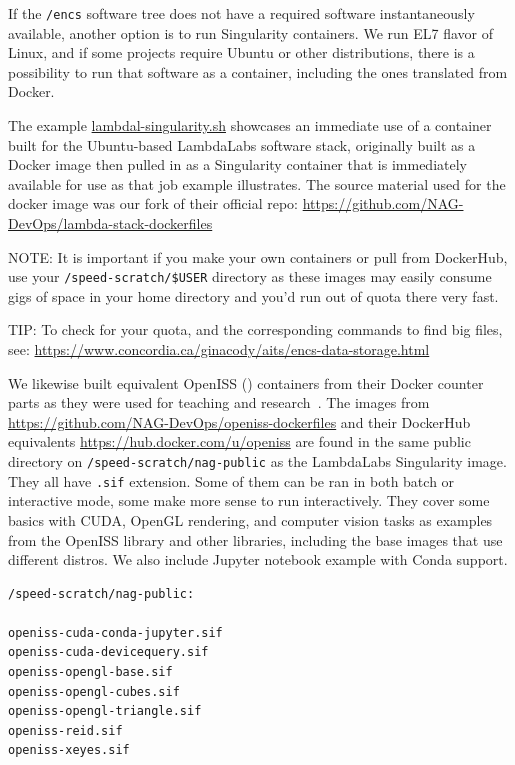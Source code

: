 
If the \texttt{/encs} software tree does not have a required software
instantaneously available, another option is to run Singularity
containers. We run EL7 flavor of Linux, and if some projects
require Ubuntu or other distributions, there is a possibility
to run that software as a container, including the ones
translated from Docker.

The example
  \href{https://github.com/NAG-DevOps/speed-hpc/blob/master/src/lambdal-singularity.sh}
  {lambdal-singularity.sh}
showcases an immediate use of a container built for the Ubuntu-based
LambdaLabs software stack, originally built as a Docker image then
pulled in as a Singularity container that is immediately available
for use as that job example illustrates. The source material
used for the docker image was our fork of their official
repo: \url{https://github.com/NAG-DevOps/lambda-stack-dockerfiles}

NOTE: It is important if you make your own containers or pull from
DockerHub, use your \verb+/speed-scratch/$USER+ directory as these
images may easily consume gigs of space in your home directory
and you'd run out of quota there very fast.

TIP: To check for your quota, and the corresponding commands
to find big files, see: \url{https://www.concordia.ca/ginacody/aits/encs-data-storage.html}

We likewise built equivalent OpenISS ()
containers from their Docker counter parts as they were used for teaching and
research~\cite{oi-containers-poster-siggraph2023}. The
images from \url{https://github.com/NAG-DevOps/openiss-dockerfiles}
and their DockerHub equivalents \url{https://hub.docker.com/u/openiss}
are found in the same public directory on \verb+/speed-scratch/nag-public+
as the LambdaLabs Singularity image. They all have \texttt{.sif} extension.
Some of them can be ran in both batch or interactive mode, some
make more sense to run interactively. They cover some basics with CUDA,
OpenGL rendering, and computer vision tasks as examples from the OpenISS
library and other libraries, including the base images that use different
distros. We also include Jupyter notebook example with Conda support.

\begin{verbatim}
/speed-scratch/nag-public:

openiss-cuda-conda-jupyter.sif
openiss-cuda-devicequery.sif
openiss-opengl-base.sif
openiss-opengl-cubes.sif
openiss-opengl-triangle.sif
openiss-reid.sif
openiss-xeyes.sif
\end{verbatim}

